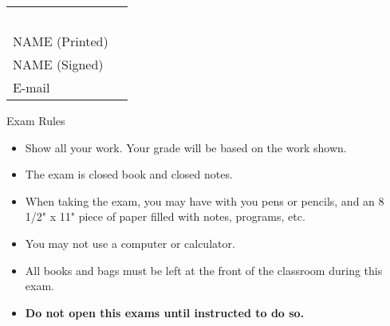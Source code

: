 {\large
\begin{center}
\begin{tabular}{ll}
\mbox{ }
\vspace{.1in} \\
NAME (Printed) & \ul{\hspace{3in}}\\ 
NAME (Signed) & \ul{\hspace{3in}} \\
E-mail & \ul{\hspace{3in}}\\
\end{tabular}
\end{center}


{\small
{\bf
\begin{center}
Exam Rules
\end{center}
\begin{itemize}
	\item Show all your work.  Your grade will be based on the work shown.          
	\item The exam is closed book and closed notes. 
        \item When taking the exam, you may have with you pens or pencils,
		and an 8 1/2" x 11" 
		piece of paper filled with notes, programs, etc. 
	\item You may not use a computer or calculator. 
	\item All books and bags must be left at the front of the classroom 
		during this exam. 
	\item {\bf Do not open this exams until instructed to do so. }
\end{itemize}
}

}}
